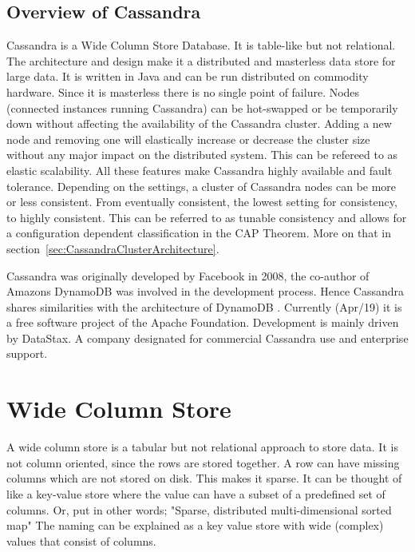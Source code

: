 \subsection{Overview of Cassandra}
Cassandra is a Wide Column Store Database. It is table-like but not relational. The architecture and design make it a distributed and masterless data store for large data. It is written in Java and can be run distributed on commodity hardware. Since it is masterless there is no single point of failure. Nodes (connected instances running Cassandra) can be hot-swapped or be temporarily down without affecting the availability of the Cassandra cluster. Adding a new node and removing one will elastically increase or decrease the cluster size without any major impact on the distributed system. This can be refereed to as elastic scalability. All these features make Cassandra highly available and fault tolerance. Depending on the settings, a cluster of Cassandra nodes can be more or less consistent. From eventually consistent, the lowest setting for consistency, to highly consistent. This can be referred to as tunable consistency and allows for a configuration dependent classification in the CAP Theorem. More on that in section~\ref{sec:CassandraClusterArchitecture}.

Cassandra was originally developed by Facebook in 2008, the co-author of Amazons DynamoDB was involved in the development process. Hence Cassandra shares similarities with the architecture of DynamoDB \autocite{lakshman2010cassandra}.
Currently (Apr/19) it is a free software project of the Apache Foundation. Development is mainly driven by DataStax. A company designated for commercial Cassandra use and enterprise support.

\section{Wide Column Store}

A wide column store is a tabular but not relational approach to store data. It is not column oriented, since the rows are stored together. A row can have missing columns which are not stored on disk. This makes it sparse.
It can be thought of like a key-value store where the value can have a subset of a predefined set of columns. Or, put in other words; "Sparse, distributed multi-dimensional sorted map" \autocite{chang2008bigtable}
The naming can be explained as a key value store with wide (complex) values that consist of columns.

